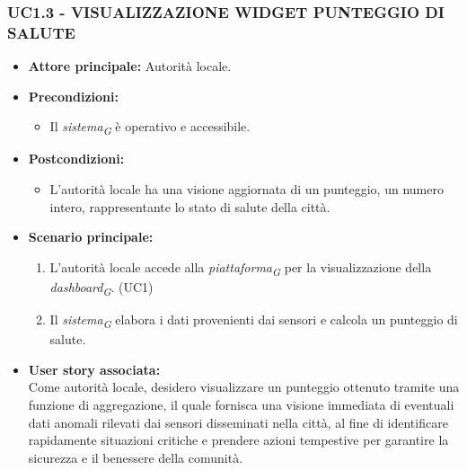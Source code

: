 \subsubsection{UC1.3 - VISUALIZZAZIONE WIDGET PUNTEGGIO DI SALUTE}
\begin{itemize}
    \item \textbf{Attore principale:} Autorità locale.
    \item \textbf{Precondizioni:}
        \begin{itemize}
            \item Il \textit{sistema}\textsubscript{\textit{G}} è operativo e accessibile.
        \end{itemize}
    \item \textbf{Postcondizioni:}
        \begin{itemize}
            \item L'autorità locale ha una visione aggiornata di un punteggio, un numero intero, rappresentante lo stato di salute della città.
        \end{itemize}
    \item \textbf{Scenario principale:}
          \begin{enumerate}
            \item L'autorità locale accede alla \textit{piattaforma}\textsubscript{\textit{G}} per la visualizzazione della \textit{dashboard}\textsubscript{\textit{G}}. (UC1)
            \item Il \textit{sistema}\textsubscript{\textit{G}} elabora i dati provenienti dai sensori e calcola un punteggio di salute.
        \end{enumerate}
    \item \textbf{User story associata:} \\
        Come autorità locale, desidero visualizzare un punteggio ottenuto tramite una funzione di aggregazione, il quale fornisca una visione immediata di eventuali dati anomali rilevati dai sensori disseminati nella città, al fine di identificare rapidamente situazioni critiche e prendere azioni tempestive per garantire la sicurezza e il benessere della comunità.
\end{itemize}